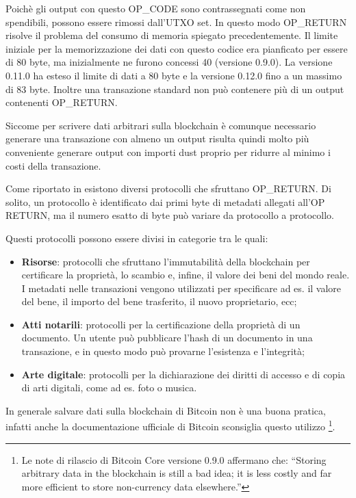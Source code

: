 Poichè gli output con questo OP\_CODE sono contrassegnati come non spendibili, possono essere rimossi dall'UTXO set. In questo modo OP\_RETURN risolve il problema del consumo di memoria spiegato precedentemente. Il limite iniziale per la memorizzazione dei dati con questo codice era pianficato per essere di 80 byte, ma inizialmente ne furono concessi 40 (versione 0.9.0).  La versione 0.11.0 \cite{v11} ha esteso il limite di dati a 80 byte e la versione 0.12.0 \cite{v12} fino a un massimo di 83 byte. Inoltre una transazione standard non può contenere più di un output contenenti OP\_RETURN.

Siccome per scrivere dati arbitrari sulla blockchain è comunque necessario generare una transazione con almeno un output risulta quindi molto più conveniente generare output con importi dust proprio per ridurre al minimo i costi della transazione.

Come riportato in \cite{OP_RETURN} esistono diversi protocolli che sfruttano OP\_RETURN. Di solito, un protocollo è identificato dai primi byte di metadati allegati all'OP RETURN, ma il numero esatto di byte può variare da protocollo a protocollo. 

Questi protocolli possono essere divisi in categorie tra le quali:
\begin{itemize}
    \item \textbf{Risorse}: protocolli che sfruttano l'immutabilità della blockchain per certificare la proprietà, lo scambio e, infine, il valore dei beni del mondo reale. I metadati nelle transazioni vengono utilizzati per specificare ad es. il valore del bene, il importo del bene trasferito, il nuovo proprietario, ecc;  
    \item \textbf{Atti notarili}: protocolli per la certificazione della proprietà di un documento. Un utente può pubblicare l'hash di un documento in una transazione, e in questo modo può provarne l'esistenza e l'integrità;
    \item \textbf{Arte digitale}: protocolli per la dichiarazione dei diritti di accesso e di copia di arti digitali, come ad es. foto o musica.
\end{itemize}

In generale salvare dati sulla blockchain di Bitcoin non è una buona pratica, infatti anche la documentazione ufficiale di Bitcoin sconsiglia questo utilizzo \footnote{Le note di rilascio di  Bitcoin Core versione 0.9.0 affermano che: “Storing arbitrary data in the blockchain is still a bad idea; it is less costly and far more efficient to store non-currency data elsewhere.”}.
